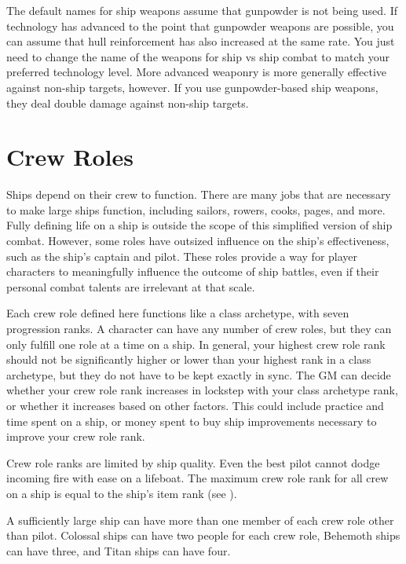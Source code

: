   The default names for ship weapons assume that gunpowder is not being used.
  If technology has advanced to the point that gunpowder weapons are possible, you can assume that hull reinforcement has also increased at the same rate.
  You just need to change the name of the weapons for ship vs ship combat to match your preferred technology level.
  More advanced weaponry is more generally effective against non-ship targets, however.
  If you use gunpowder-based ship weapons, they deal double damage against non-ship targets.

\section{Crew Roles}\label{Crew Roles}
  Ships depend on their crew to function.
  There are many jobs that are necessary to make large ships function, including sailors, rowers, cooks, pages, and more.
  Fully defining life on a ship is outside the scope of this simplified version of ship combat.
  However, some roles have outsized influence on the ship's effectiveness, such as the ship's captain and pilot.
  These roles provide a way for player characters to meaningfully influence the outcome of ship battles, even if their personal combat talents are irrelevant at that scale.

  Each crew role defined here functions like a class archetype, with seven progression ranks.
  A character can have any number of crew roles, but they can only fulfill one role at a time on a ship.
  In general, your highest crew role rank should not be significantly higher or lower than your highest rank in a class archetype, but they do not have to be kept exactly in sync.
  The GM can decide whether your crew role rank increases in lockstep with your class archetype rank, or whether it increases based on other factors.
  This could include practice and time spent on a ship, or money spent to buy ship improvements necessary to improve your crew role rank.

  Crew role ranks are limited by ship quality.
  Even the best pilot cannot dodge incoming fire with ease on a lifeboat.
  The maximum crew role rank for all crew on a ship is equal to the ship's item rank (see ).

  A sufficiently large ship can have more than one member of each crew role other than pilot.
  Colossal ships can have two people for each crew role, Behemoth ships can have three, and Titan ships can have four.

